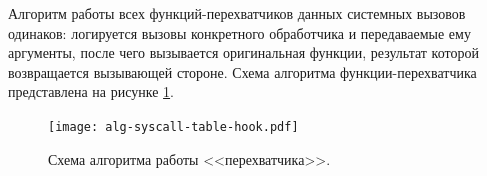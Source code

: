 

    Алгоритм работы всех функций-перехватчиков данных системных вызовов
    одинаков: логируется вызовы конкретного обработчика и передаваемые ему аргументы,
    после чего вызывается оригинальная функции, результат которой возвращается вызывающей стороне.
    Схема алгоритма функции-перехватчика представлена на рисунке \ref{schema:syscall:hook:alg}.

    \begin{figure}[h!]
        \centering
        \texttt{[image: alg-syscall-table-hook.pdf]}
        \caption{Схема алгоритма работы <<перехватчика>>.}
        \label{schema:syscall:hook:alg}
    \end{figure}



\pagebreak